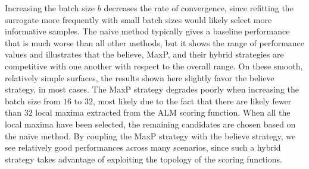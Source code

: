 Increasing the batch size $b$ decreases the rate of convergence, since refitting the surrogate more frequently with small batch sizes would likely select more informative samples.
%
The naive method typically gives a baseline performance that is much worse than all other methods, but it shows the range of performance values and illustrates that the believe, MaxP, and their hybrid strategies are competitive with one another with respect to the overall range.
%
On these smooth, relatively simple surfaces, the results shown here slightly favor the believe strategy, in most cases.
%
The MaxP strategy degrades poorly when increasing the batch size from $16$ to $32$, most likely due to the fact that there are likely fewer than $32$ local maxima extracted from the ALM scoring function.
%
When all the local maxima have been selected, the remaining candidates are chosen based on the naive method.
%
By coupling the MaxP strategy with the believe strategy, we see relatively good performances across many scenarios, since such a hybrid strategy takes advantage of exploiting the topology of the scoring functions.

